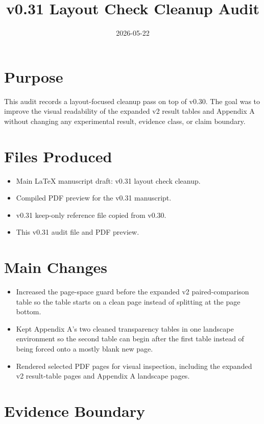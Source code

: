 \documentclass[11pt]{article}
\title{v0.31 Layout Check Cleanup Audit}
\author{}
\date{2026-05-22}
\begin{document}
\maketitle

\section{Purpose}

This audit records a layout-focused cleanup pass on top of v0.30. The goal was to improve the visual readability of the expanded v2 result tables and Appendix A without changing any experimental result, evidence class, or claim boundary.

\section{Files Produced}

\begin{itemize}
  \item Main LaTeX manuscript draft: v0.31 layout check cleanup.
  \item Compiled PDF preview for the v0.31 manuscript.
  \item v0.31 keep-only reference file copied from v0.30.
  \item This v0.31 audit file and PDF preview.
\end{itemize}

\section{Main Changes}

\begin{itemize}
  \item Increased the page-space guard before the expanded v2 paired-comparison table so the table starts on a clean page instead of splitting at the page bottom.
  \item Kept Appendix A's two cleaned transparency tables in one landscape environment so the second table can begin after the first table instead of being forced onto a mostly blank new page.
  \item Rendered selected PDF pages for visual inspection, including the expanded v2 result-table pages and Appendix A landscape pages.
\end{itemize}

\section{Evidence Boundary}
\end{document}
